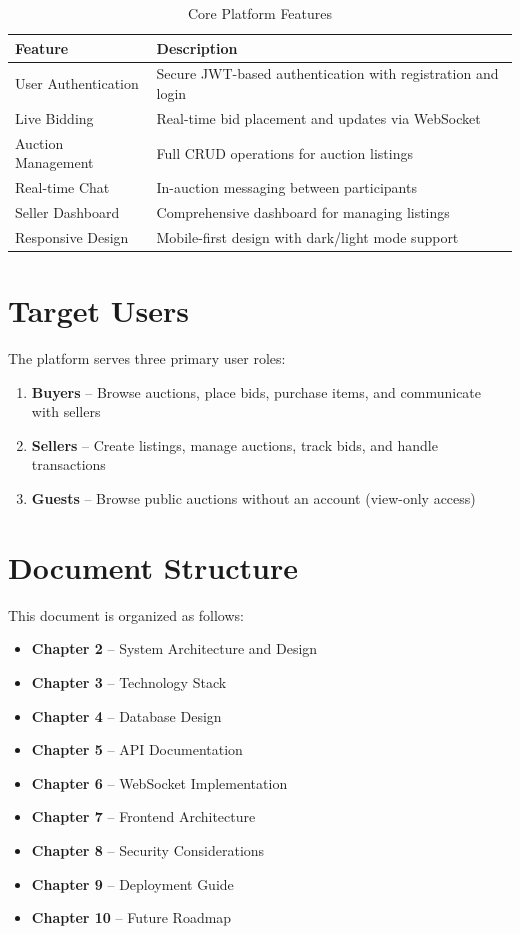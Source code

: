 \documentclass[12pt,a4paper]{report}
\begin{document}
\begin{table}[H]
\centering
\begin{tabularx}{\textwidth}{|l|X|}
\hline
\textbf{Feature} & \textbf{Description} \\
\hline
User Authentication & Secure JWT-based authentication with registration and login \\
\hline
Live Bidding & Real-time bid placement and updates via WebSocket \\
\hline
Auction Management & Full CRUD operations for auction listings \\
\hline
Real-time Chat & In-auction messaging between participants \\
\hline
Seller Dashboard & Comprehensive dashboard for managing listings \\
\hline
Responsive Design & Mobile-first design with dark/light mode support \\
\hline
\end{tabularx}
\caption{Core Platform Features}
\end{table}

\section{Target Users}

The platform serves three primary user roles:

\begin{enumerate}
    \item \textbf{Buyers} -- Browse auctions, place bids, purchase items, and communicate with sellers
    \item \textbf{Sellers} -- Create listings, manage auctions, track bids, and handle transactions
    \item \textbf{Guests} -- Browse public auctions without an account (view-only access)
\end{enumerate}

\section{Document Structure}

This document is organized as follows:

\begin{itemize}
    \item \textbf{Chapter 2} -- System Architecture and Design
    \item \textbf{Chapter 3} -- Technology Stack
    \item \textbf{Chapter 4} -- Database Design
    \item \textbf{Chapter 5} -- API Documentation
    \item \textbf{Chapter 6} -- WebSocket Implementation
    \item \textbf{Chapter 7} -- Frontend Architecture
    \item \textbf{Chapter 8} -- Security Considerations
    \item \textbf{Chapter 9} -- Deployment Guide
    \item \textbf{Chapter 10} -- Future Roadmap
\end{itemize}
\end{document}

